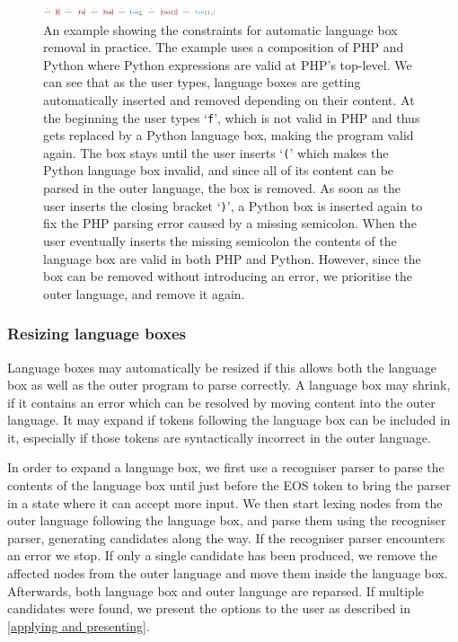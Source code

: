 \documentclass[sigplan,screen]{acmart}\settopmatter{printfolios=true,printccs=false,printacmref=false}
\newcommand{\qtt}[1]{`\texttt{#1}'\xspace}
\begin{document}
\begin{figure}
\begin{center}
\vspace{0.8em}
\includegraphics[width=0.45\textwidth]{images/autoremove_foo.png}
\vspace{-0.8em}
\end{center}
\caption{An example showing the constraints for automatic language box removal in practice.
The example uses a composition of PHP and Python where Python expressions are valid at
PHP's top-level.
We can see that as the user types, language boxes are getting automatically
inserted and removed depending on their content. At the beginning the user types
\qtt{f}, which is not valid in PHP and thus gets replaced by a Python
language box, making the program valid again. The box stays until the user
inserts \qtt{(} which makes the Python language box invalid, and since all of
its content can be parsed in the outer language, the box is removed.
As soon as the user inserts the closing bracket \qtt{)}, a Python box is
inserted again to fix the PHP parsing error caused by a missing semicolon. When the
user eventually inserts the missing semicolon the contents of the language box
are valid in both PHP and Python. However, since the box can be removed
without introducing an error, we prioritise the outer
language, and remove it again.}
\label{fig_autoremoval}
\end{figure}


\subsubsection{Resizing language boxes}

Language boxes may automatically be resized if this allows both the language box as
well as the outer program to parse correctly. A language box may shrink, if it
contains an error which can be resolved by moving content into the outer
language. It may expand if tokens following the language box can be included in it,
especially if those tokens are syntactically incorrect in the outer language.

In order to expand a language box, we first use a recogniser parser to parse
the contents of the language box until just before the EOS token to bring the
parser in a state where it can accept more input. We then start lexing nodes
from the outer language following the language box, and parse them using the
recogniser parser, generating candidates along the way. If the recogniser
parser encounters an error we stop. If only a single candidate has been
produced, we remove the affected nodes from the outer language and move them
inside the language box. Afterwards, both language box and outer language are
reparsed.  If multiple candidates were found, we present the options to the
user as described in \autoref{applying and presenting}.
\end{document}
